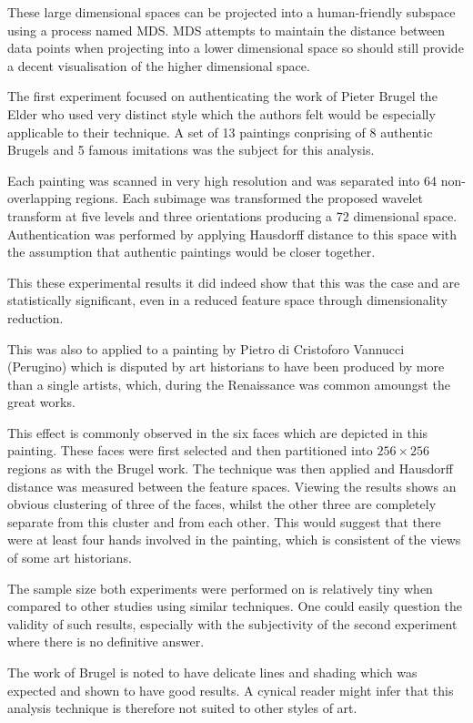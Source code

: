 \documentclass[conference]{IEEEtran}
\begin{document}
These large dimensional spaces can be projected into a human-friendly subspace
using a process named \gls{MDS}. \Gls{MDS} attempts to maintain the distance
between data points when projecting into a lower dimensional space so should
still provide a decent visualisation of the higher dimensional space.

The first experiment focused on authenticating the work of Pieter Brugel the
Elder who used very distinct style which the authors felt would be especially
applicable to their technique. A set of 13 paintings conprising of 8 authentic
Brugels and 5 famous imitations was the subject for this analysis.

Each painting was scanned in very high resolution and was separated into 64
non-overlapping regions. Each subimage was transformed the proposed wavelet
transform at five levels and three orientations producing a 72 dimensional
space. Authentication was performed by applying Hausdorff distance to this
space with the assumption that authentic paintings would be closer together.

This these experimental results it did indeed show that this was the case and
are statistically significant, even in a reduced feature space through
dimensionality reduction.

This was also to applied to a painting by Pietro di Cristoforo Vannucci
(Perugino) which is disputed by art historians to have been produced by more
than a single artists, which, during the Renaissance was common amoungst the
great works.

This effect is commonly observed in the six faces which are depicted in this
painting. These faces were first selected and then partitioned into $256 \times
256$ regions as with the Brugel work. The technique was then applied and
Hausdorff distance was measured between the feature spaces. Viewing the results
shows an obvious clustering of three of the faces, whilst the other three are
completely separate from this cluster and from each other. This would suggest
that there were at least four hands involved in the painting, which is
consistent of the views of some art historians. 

The sample size both experiments were performed on is relatively tiny when
compared to other studies using similar techniques. One could easily question
the validity of such results, especially with the subjectivity of the second
experiment where there is no definitive answer.

The work of Brugel is noted to have delicate lines and shading which was
expected and shown to have good results. A cynical reader might infer that this
analysis technique is therefore not suited to other styles of art.
\end{document}
